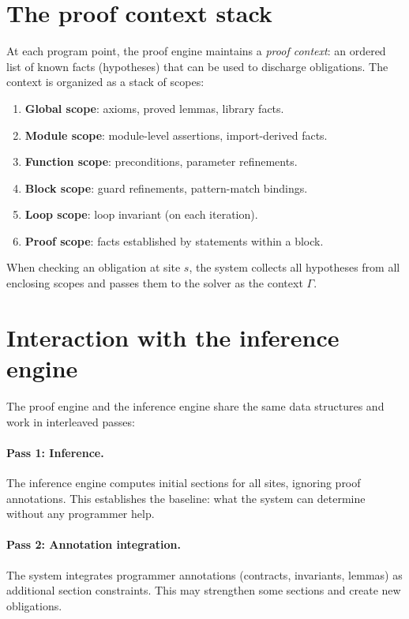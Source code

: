 \documentclass[11pt]{report}
\DeclareRobustCommand{\py}[1]{\texttt{\detokenize{#1}}}
\theoremstyle{definition}
\theoremstyle{plain}
\begin{document}
\section{The proof context stack}

At each program point, the proof engine maintains a \emph{proof context}: an
ordered list of known facts (hypotheses) that can be used to discharge
obligations. The context is organized as a stack of scopes:

\begin{enumerate}[nosep]
  \item \textbf{Global scope}: axioms, proved lemmas, library facts.
  \item \textbf{Module scope}: module-level assertions, import-derived facts.
  \item \textbf{Function scope}: preconditions, parameter refinements.
  \item \textbf{Block scope}: guard refinements, pattern-match bindings.
  \item \textbf{Loop scope}: loop invariant (on each iteration).
  \item \textbf{Proof scope}: facts established by \py{have} statements within
        a \py{with proof()} block.
\end{enumerate}

When checking an obligation at site $s$, the system collects all hypotheses
from all enclosing scopes and passes them to the solver as the context $\Gamma$.

\section{Interaction with the inference engine}

The proof engine and the inference engine share the same data structures and
work in interleaved passes:

\paragraph{Pass 1: Inference.}
The inference engine computes initial sections for all sites, ignoring proof
annotations. This establishes the baseline: what the system can determine
without any programmer help.

\paragraph{Pass 2: Annotation integration.}
The system integrates programmer annotations (contracts, invariants, lemmas)
as additional section constraints. This may strengthen some sections and
create new obligations.
\end{document}
